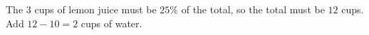 The $3$ cups of lemon juice must be $25\%$ of the total, so the total must be $12$ cups. Add $12-10=\boxed{2}$ cups of water.
